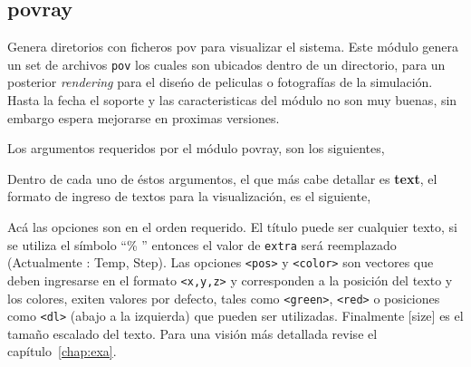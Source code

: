 \subsection{povray}
Genera diretorios con ficheros pov para visualizar el sistema. Este m\'odulo genera un set de archivos \verb|pov| los cuales son ubicados dentro de un directorio, para un posterior \textit{rendering} para el dise\'no de peliculas o fotograf\'ias de la simulaci\'on. Hasta la fecha el soporte y las caracteristicas del m\'odulo no son muy buenas, sin embargo espera mejorarse en proximas versiones.

Los argumentos requeridos por el m\'odulo povray, son los siguientes,


Dentro de cada uno de \'estos argumentos, el que m\'as cabe detallar es \textbf{text}, el formato de ingreso de textos para la visualizaci\'on, es el siguiente,


Ac\'a las opciones son en el orden requerido. El t\'itulo puede ser cualquier texto, si se utiliza el s\'imbolo ``\% '' entonces el valor de \verb|extra| ser\'a reemplazado (Actualmente : Temp, Step). Las opciones \verb|<pos>| y \verb|<color>| son vectores que deben ingresarse en el formato \verb|<x,y,z>| y corresponden a la posici\'on del texto y los colores, exiten valores por defecto, tales como \verb|<green>|, \verb|<red>| o posiciones como \verb|<dl>| (abajo a la izquierda) que pueden ser utilizadas. Finalmente [size] es el tama\~no escalado del texto. Para una visi\'on m\'as detallada revise el cap\'itulo~\ref{chap:exa}.

